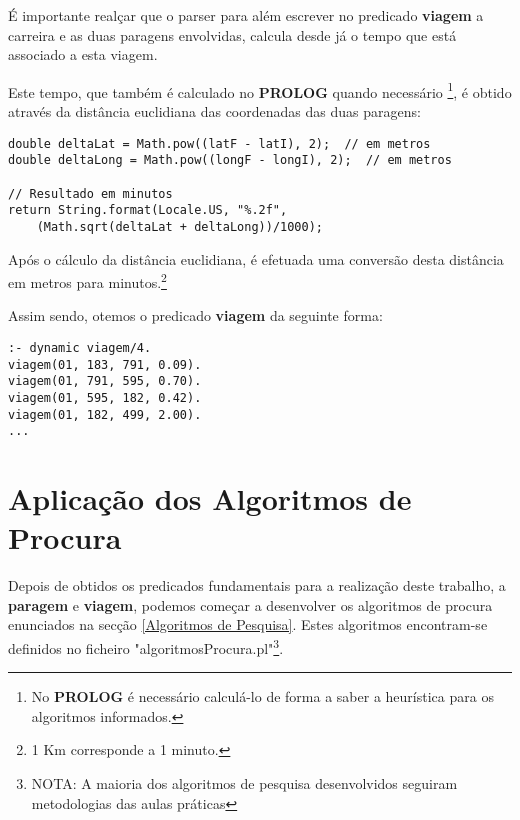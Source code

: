 \documentclass[a4paper,12pt]{report}
\begin{document}
\vspace{0.5cm}

\par É importante realçar que o parser para além escrever no predicado \textbf{viagem} a carreira e as duas paragens envolvidas, calcula desde já o tempo que está associado a esta viagem.

\par Este tempo, que também é calculado no \textbf{PROLOG} quando necessário \footnote{No \textbf{PROLOG} é necessário calculá-lo de forma a saber a heurística para os algoritmos informados.}, é obtido através da distância euclidiana das coordenadas das duas paragens:

\begin{verbatim}
double deltaLat = Math.pow((latF - latI), 2);  // em metros
double deltaLong = Math.pow((longF - longI), 2);  // em metros

// Resultado em minutos
return String.format(Locale.US, "%.2f",
    (Math.sqrt(deltaLat + deltaLong))/1000);
\end{verbatim}

Após o cálculo da distância euclidiana, é efetuada uma conversão desta distância em metros para minutos.\footnote{1 Km corresponde a 1 minuto.}

\vspace{0.5cm}
Assim sendo, otemos o predicado \textbf{viagem} da seguinte forma:
\begin{verbatim}
:- dynamic viagem/4. 
viagem(01, 183, 791, 0.09).
viagem(01, 791, 595, 0.70).
viagem(01, 595, 182, 0.42).
viagem(01, 182, 499, 2.00).
...
\end{verbatim}


\vspace{5cm}


\section{Aplicação dos Algoritmos de Procura}
\label{Aplicação dos Algoritmos de Procura}

Depois de obtidos os predicados fundamentais para a realização deste trabalho, a \textbf{paragem} e \textbf{viagem}, podemos começar a desenvolver os algoritmos de procura enunciados na secção \ref{Algoritmos de Pesquisa}. Estes algoritmos encontram-se definidos no ficheiro "algoritmosProcura.pl"\footnote{NOTA: A maioria dos algoritmos de pesquisa desenvolvidos seguiram metodologias das aulas práticas}.

\vspace{0.5cm}
\end{document}
